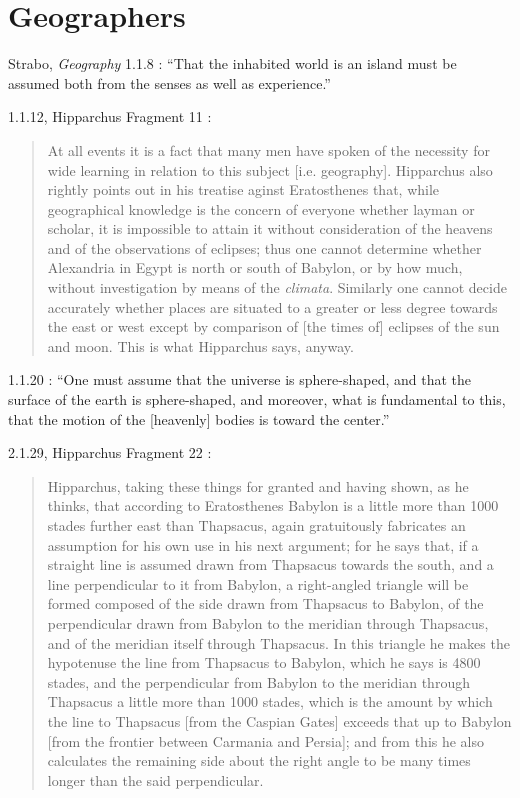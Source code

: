 \documentclass{article}
\theoremstyle{definition}
\begin{document}
\section{Geographers}
Strabo, {\em Geography} 1.1.8 \cite[p.~40]{strabo}: ``That the inhabited world is an island must be assumed both from the senses as well
as experience.''

1.1.12, Hipparchus Fragment 11 \cite[p.~65]{dicks}:

\begin{quote}
At all events it is a fact that many men have spoken of the
necessity for wide learning in relation to this subject [i.e.
geography]. Hipparchus also rightly points out in his treatise
aginst Eratosthenes that, while geographical knowledge is the
concern of everyone whether layman or scholar, it is impossible
to attain it without consideration of the heavens and of the
observations of eclipses; thus one cannot determine whether
Alexandria in Egypt is north or south of Babylon, or by how
much, without investigation by means of the {\em climata}. Similarly
one cannot decide accurately whether places are situated to
a greater or less degree towards the east or west except by
comparison of [the times of] eclipses of the sun and moon.
This is what Hipparchus says, anyway.
\end{quote}

1.1.20  \cite[p.~45]{strabo}: ``One must assume that the universe is sphere-shaped,
and that the surface of the earth is sphere-shaped, and moreover, what is fundamental
to this, that the motion of the [heavenly] bodies is toward the center.'' 

2.1.29, Hipparchus Fragment 22  \cite[pp.~73--75]{dicks}:

\begin{quote}
Hipparchus, taking these things for granted and having shown,
as he thinks, that according to Eratosthenes Babylon is a little
more than 1000 stades further east than Thapsacus, again
gratuitously fabricates an assumption for his own use in his
next argument; for he says that, if a straight line is assumed
drawn from Thapsacus towards the south, and a line
perpendicular to it from Babylon, a right-angled triangle will be
formed composed of the side drawn from Thapsacus to Babylon,
of the perpendicular drawn from Babylon to the meridian
through Thapsacus, and of the meridian itself through
Thapsacus. In this triangle he makes the hypotenuse the line from
Thapsacus to Babylon, which he says is 4800 stades, and the
perpendicular from Babylon to the meridian through
Thapsacus a little more than 1000 stades, which is the amount by
which the line to Thapsacus [from the Caspian Gates] exceeds
that up to Babylon [from the frontier between Carmania and Persia];
and from this he also calculates the remaining side
about the right angle to be many times longer than the said
perpendicular.
\end{quote}
\end{document}
